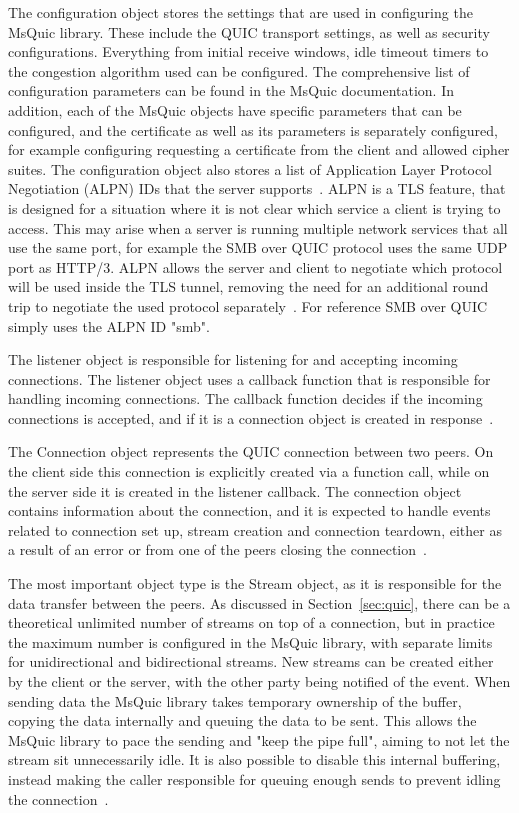 \documentclass[english, 12pt, a4paper, elec, utf8, a-2b, online]{aaltothesis}
\begin{document}
The configuration object stores the settings that are used in configuring the MsQuic
library. These include the QUIC transport settings, as well as security configurations. Everything
from initial receive windows, idle timeout timers to the congestion algorithm used
can be configured. The comprehensive list of configuration parameters can be found
in the MsQuic documentation. In addition, each of the MsQuic objects have specific
parameters that can be configured, and the certificate as well as its parameters
is separately configured, for example configuring requesting a certificate from the client
and allowed cipher suites. The configuration object also stores a list of
Application Layer Protocol Negotiation (ALPN) IDs that the server supports~\cite{msquic_docs}.
ALPN is a TLS feature, that is designed for a situation where it is not clear which
service a client is trying to access. This may arise when a server is running
multiple network services that all use the same port, for example the SMB over
QUIC protocol uses the same UDP
port as HTTP/3. ALPN allows the server and client to negotiate which protocol
will be used inside the TLS tunnel, removing the need for an additional round trip to negotiate
the used protocol separately~\cite{rfc7301}. For reference SMB over QUIC simply uses the ALPN ID "smb".

The listener object is responsible for listening for
and accepting incoming connections. The listener object uses a callback function
that is responsible for handling incoming connections. The callback function decides
if the incoming connections is accepted, and if it is a connection object is created
in response~\cite{msquic_docs}.

The Connection object represents the QUIC connection between two peers. On the client
side this connection is explicitly created via a function call, while on the server
side it is created in the listener callback. The connection object contains information
about the connection, and it is expected to handle events related to connection set up,
stream creation and connection teardown, either as a result of an error or from one
of the peers closing the connection~\cite{msquic_docs}.

The most important object type is the Stream object, as it is responsible for
the data transfer between the peers. As discussed in Section~\ref{sec:quic}, there
can be a theoretical unlimited number of streams on top of a connection, but in
practice the maximum number is configured in the MsQuic library, with separate
limits for unidirectional and bidirectional streams. New streams can be created
either by the client or the server, with the other party being notified of
the event. When sending data the MsQuic library takes temporary ownership of the
buffer, copying the data internally and queuing the data to be sent. This allows
the MsQuic library to pace the sending and "keep the pipe full", aiming to not let
the stream sit unnecessarily idle. It is also possible to disable this internal buffering,
instead making the caller responsible for queuing enough sends to prevent idling
the connection~\cite{msquic_docs}.
\end{document}
